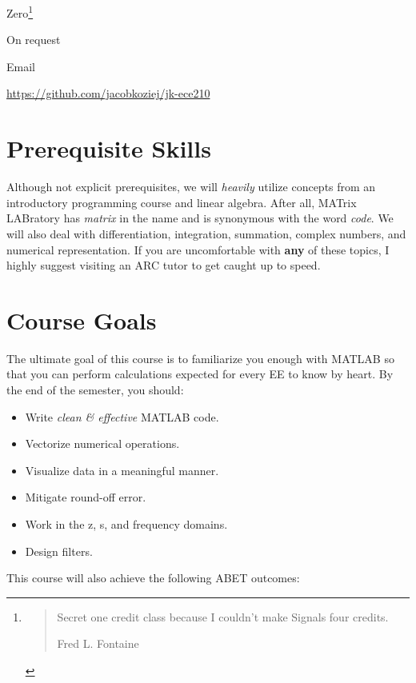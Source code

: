 \documentclass{article}
\begin{document}
\noindent
{} Zero\footnote{\blockquote[Fred L. Fontaine]{Secret one
credit class because I couldn't make Signals four credits.}}

\noindent
{} On request

\noindent
{} Email

\noindent
{} \url{https://github.com/jacobkoziej/jk-ece210}

\section{Prerequisite Skills}

Although not explicit prerequisites, we will \emph{heavily} utilize
concepts from an introductory programming course and linear algebra.
After all, MATrix LABratory has \emph{matrix} in the name and is
synonymous with the word \emph{code}.  We will also deal with
differentiation, integration, summation, complex numbers, and numerical
representation.  If you are uncomfortable with \textbf{any} of these
topics, I highly suggest visiting an ARC tutor to get caught up to
speed.

\section{Course Goals}

The ultimate goal of this course is to familiarize you enough with
MATLAB so that you can perform calculations expected for every EE to
know by heart.  By the end of the semester, you should:

\begin{itemize}
	\item
		Write \emph{clean \& effective} MATLAB code.

	\item
		Vectorize numerical operations.

	\item
		Visualize data in a meaningful manner.

	\item
		Mitigate round-off error.

	\item
		Work in the z, s, and frequency domains.

	\item
		Design filters.
\end{itemize}

\noindent
This course will also achieve the following ABET outcomes:
\end{document}
